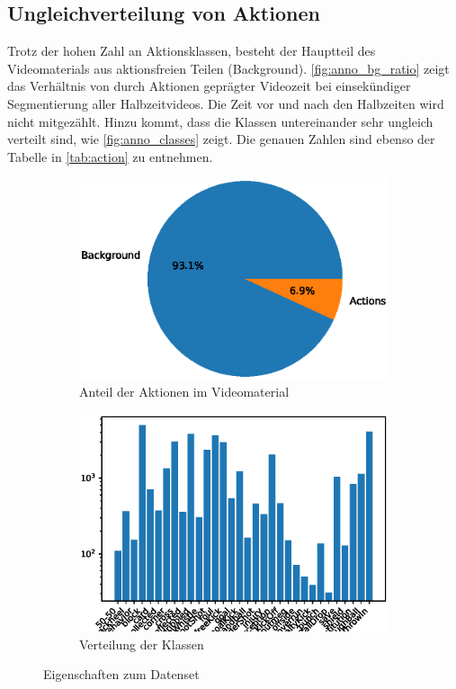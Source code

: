 \subsection{Ungleichverteilung von Aktionen}
\label{subsec:ungleichverteilung-von-aktionen}

Trotz der hohen Zahl an Aktionsklassen, besteht der Hauptteil des Videomaterials aus aktionsfreien Teilen (Background).
\autoref{fig:anno_bg_ratio} zeigt das Verhältnis von durch Aktionen geprägter Videozeit bei einsekündiger Segmentierung aller Halbzeitvideos.
Die Zeit vor und nach den Halbzeiten wird nicht mitgezählt.
Hinzu kommt, dass die Klassen untereinander sehr ungleich verteilt sind, wie \autoref{fig:anno_classes} zeigt.
Die genauen Zahlen sind ebenso der Tabelle in \autoref{tab:action} zu entnehmen.

\begin{figure}
    \centering
    \begin{subfigure}{.5\textwidth}
        \centering
        \includegraphics[width=.9\linewidth]{img/data-plots/background_ratio_all_annos.eps}
        \caption{Anteil der Aktionen im Videomaterial}
        \label{fig:anno_bg_ratio}
    \end{subfigure}%
    \begin{subfigure}{.5\textwidth}
        \centering
        \includegraphics[width=.95\linewidth]{img/data-plots/class_distribution_annotations_all.eps}
        \caption{Verteilung der Klassen}
        \label{fig:anno_classes}
    \end{subfigure}
    \caption{Eigenschaften zum Datenset}
    \label{fig:annotations}
\end{figure}


